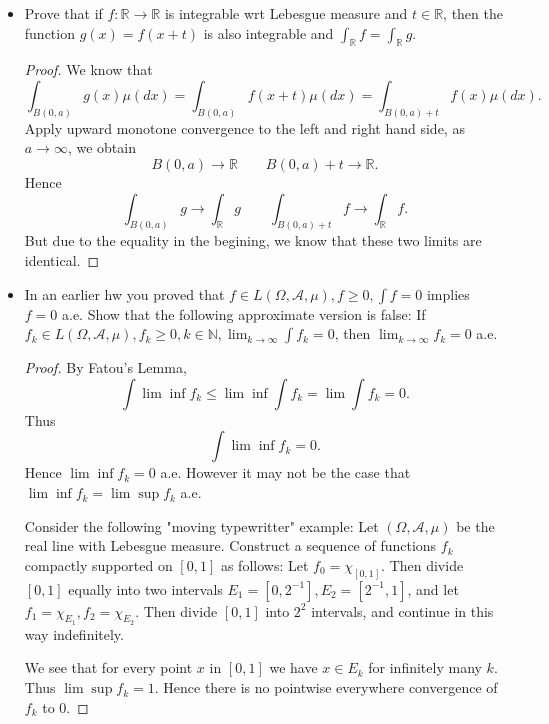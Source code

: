 \begin{itemize}
	\item Prove that if $f: \mathbb{R}\to \mathbb{R}$ is integrable wrt Lebesgue measure and $t \in \mathbb{R}$, then the function $g(x) = f(x + t)$ is also integrable and $\int _{\mathbb{R}} f = \int _{\mathbb{R}} g$.
\begin{proof}
	We know that
	\[
		\int_{B(0,a)} g(x) \mu(dx) = \int_{B(0, a)} f(x+t) \mu(dx) = \int _{B(0,a) + t} f(x) \mu(dx)
	.\] 
	Apply upward monotone convergence to the left and right hand side, as $a \to \infty $, we obtain
	\[
		B\left(0,a \right) \to \mathbb{R}\qquad
		B(0,a) + t \to \mathbb{R}
	.\] 
	Hence
	\[
		\int_{B(0,a)}g \to \int _{\mathbb{R}}g \qquad 
		\int _{B(0,a) + t}f \to  \int _{\mathbb{R}} f
	.\] 
	But due to the equality in the begining, we know that these two limits are identical.
\end{proof}

	\item In an earlier hw you proved that $f \in L(\Omega, \mathcal{A}, \mu), f\ge 0, \int f = 0$ implies $f = 0 $ a.e. Show that the following approximate version is false: If $f_k \in L(\Omega, \mathcal{A}, \mu), f_k \ge 0, k \in \mathbb{N}, \lim_{k \to \infty} \int f_k = 0$, then $\lim_{k \to \infty} f_k = 0$ a.e.
\begin{proof}
	By Fatou's Lemma, 
	\[
		\int \lim \inf f_k \le \lim \inf \int f_k = \lim \int f_k = 0
	.\] 
	Thus
	\[
		\int \lim \inf f_k = 0
	.\] 
	Hence $\lim \inf f_k = 0$ a.e.
	However it may not be the case that $\lim\inf f_k = \lim \sup f_k$ a.e. 

	Consider the following "moving typewritter" example: Let $(\Omega, \mathcal{A}, \mu)$ be the real line with Lebesgue measure. Construct a sequence of functions $f_k$ compactly supported on $[0,1]$ as follows: Let $f_0 = \chi_{[0,1]}$. Then divide $[0,1]$ equally into two intervals $E_1 = [0,2^{-1}], E_2 = [2^{-1}, 1]$, and let $f_1 = \chi_{E_1}, f_{2} = \chi_{E_2}$. Then divide $[0,1]$ into $2^{2}$ intervals, and continue in this way indefinitely.

	We see that for every point $x$ in $[0,1]$ we have $x \in E_k$ for infinitely many $k$. Thus $\lim \sup f_k = 1$. Hence there is no pointwise everywhere convergence of $f_k$ to $0$.
\end{proof}


\end{itemize}

